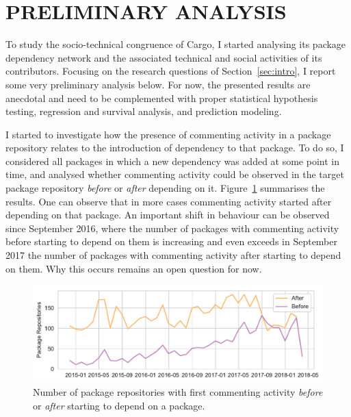 \section{PRELIMINARY ANALYSIS}

To study the socio-technical congruence of Cargo, I started analysing its package dependency network and the associated technical and social activities of its contributors.
Focusing on the research questions of Section~\ref{sec:intro}, I report some very preliminary analysis below.
For now, the presented results are anecdotal and need to be complemented with proper statistical hypothesis testing, regression and survival analysis, and prediction modeling.

I started to investigate how the presence of commenting activity in a package repository relates to the introduction of dependency to that package.
To do so, I considered all packages in which a new dependency was added at some point in time, and analysed whether commenting activity could be observed in the target package repository \emph{before} or \emph{after} depending on it. Figure~\ref{fig:fig1} summarises the results. One can observe that in more cases commenting activity started after depending on that package. 
An important shift in behaviour can be observed since September 2016, where the number of packages with commenting activity before starting to depend on them is increasing and even exceeds in September 2017 the number of packages with commenting activity after starting to depend on them. Why this occurs remains an open question for now.

\begin{figure}[thb]
\vspace{-0.3cm}
    \includegraphics[width=0.9\columnwidth]{Photos/RQ21.pdf} 
\vspace{-0.3cm}
    \caption{Number of package repositories with first commenting activity \emph{before} or \emph{after} starting to depend on a package.}
    \label{fig:fig1}
\end{figure}

